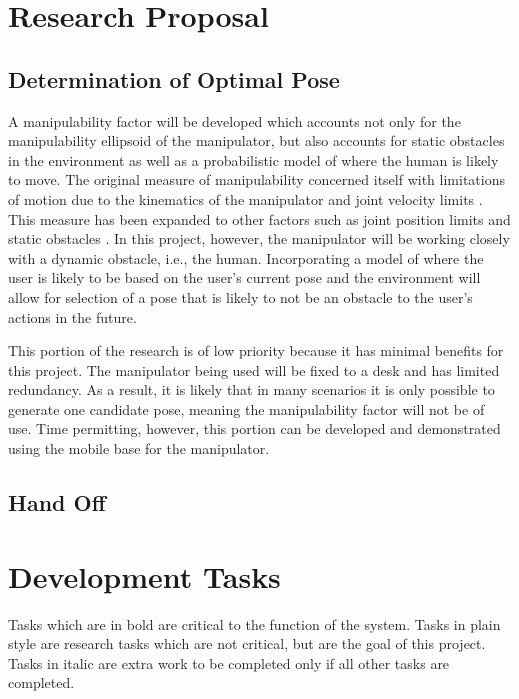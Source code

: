 \documentclass[10pt]{article}
\begin{document}
\section{Research Proposal}
\subsection{Determination of Optimal Pose}
A manipulability factor will be developed which accounts not only for the manipulability ellipsoid of the manipulator, but also accounts for static obstacles in the environment as well as a probabilistic model of where the human is likely to move. The original measure of manipulability concerned itself with limitations of motion due to the kinematics of the manipulator and joint velocity limits \cite{Yoshikawa1985}. This measure has been expanded to other factors such as joint position limits and static obstacles \cite{Vahrenkamp2012}. In this project, however, the manipulator will be working closely with a dynamic obstacle, i.e., the human. Incorporating a model of where the user is likely to be based on the user's current pose and the environment will allow for selection of a pose that is likely to not be an obstacle to the user's actions in the future.

This portion of the research is of low priority because it has minimal benefits for this project. The manipulator being used will be fixed to a desk and has limited redundancy. As a result, it is likely that in many scenarios it is only possible to generate one candidate pose, meaning the manipulability factor will not be of use. Time permitting, however, this portion can be developed and demonstrated using the mobile base for the manipulator.

\subsection{Hand Off}


\section{Development Tasks}
Tasks which are in bold are critical to the function of the system. Tasks in plain style are research tasks which are not critical, but are the goal of this project. Tasks in italic are extra work to be completed only if all other tasks are completed.
\end{document}
